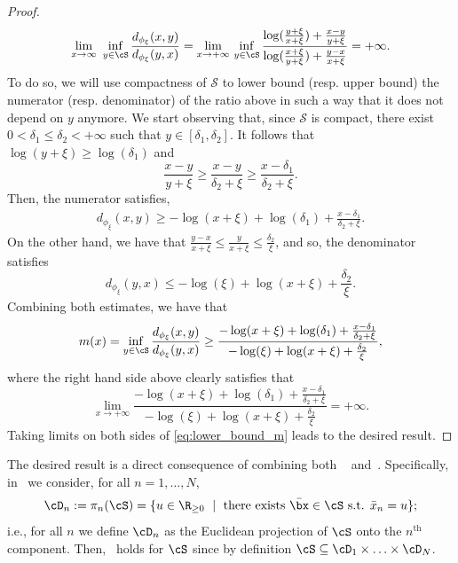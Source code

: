 \documentclass[11pt]{amsart}
\begin{document}
\begin{proof}
$$
    \lim_{x\to\infty} \ \underset{y \in \cS}{\inf}\, \frac{d_{\phi_\xi}(x,y)}{d_{\phi_\xi}(y,x)} = \underset{x \to + \infty}{\lim} \ \underset{y \in \cS}{\inf} \, \frac{\log(\frac{y+\xi}{x+\xi})+\frac{x-y}{y+\xi}}{ \log(\frac{x+\xi}{y+\xi})+\frac{y-x}{x+\xi}}=+\infty.
$$
To do so, we will use compactness of $\mathcal{S}$ to lower bound (resp. upper bound) the numerator (resp. denominator) of the ratio above in such a way that it does not depend on $y$ anymore. We start observing that, since $\mathcal{S}$ is compact, there exist $0<\delta_1\leq\delta_2<+\infty$ such that $y\in[\delta_1,\delta_2]$. It follows that $\log(y+\xi)\geq \log(\delta_1)$ and
$$
\frac{x-y}{y+\xi}\geq \frac{x-y}{\delta_2+\xi}\geq\frac{x-\delta_1}{\delta_2+\xi}.
$$
Then, the numerator satisfies,
$$
\begin{aligned}
d_{\phi_\xi}(x,y)\geq  -\log(x+\xi)+\log(\delta_1)+\frac{x-\delta_1}{\delta_2+\xi}.
\end{aligned}
$$
On the other hand, we have that $\frac{y-x}{x+\xi}\leq \frac{y}{x+\xi}\leq \frac{\delta_2}{\xi}$, and so, the denominator satisfies
$$
 d_{\phi_\xi}(y,x)\leq -\log(\xi)+\log(x+\xi)+\frac{\delta_2}{\xi}.
$$
Combining both estimates, we have that
\begin{equation}\label{eq:lower_bound_m}
m(x)=\underset{y \in \cS}{\inf} \, \frac{d_{\phi_\xi}(x,y)}{d_{\phi_\xi}(y,x)}\geq\frac{-\log(x+\xi)+\log(\delta_1)+\frac{x-\delta_1}{\delta_2+\xi}}{-\log(\xi)+\log(x+\xi)+\frac{\delta_2}{\xi}},
\end{equation}
where the right hand side above clearly satisfies that
$$
\underset{x \to + \infty}{\operatorname{lim}} \frac{-\log(x+\xi)+\log(\delta_1)+\frac{x-\delta_1}{\delta_2+\xi}}{-\log(\xi)+\log(x+\xi)+\frac{\delta_2}{\xi}}= + \infty.
$$
Taking limits on both sides of \eqref{eq:lower_bound_m} leads to the desired result. 
\end{proof}
The desired result is a direct consequence of combining both ~ and~. Specifically, in~ we consider, for all $n=1,\ldots, N$,
$$
\cD_n:=\pi_n(\cS)=\{u \in\R_{\geq 0} \ \mid \ \text{there exists } \bar \bx \in \cS \text{ s.t. } \bar x_n = u\};
$$
i.e., for all $n$ we define $\cD_n$ as the Euclidean projection of $\cS$ onto the $n^{\mathrm{th}}$ component. Then,~ holds for $\cS$ since by definition $\cS\subseteq\cD_1\times\ldots\times\cD_N$.
\end{document}
